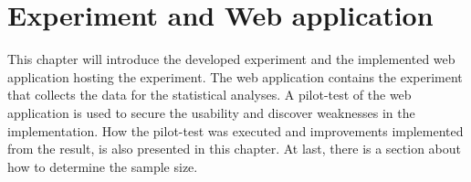\chapter{Experiment and Web application}
This chapter will introduce the developed experiment and the implemented web application hosting the experiment. The web application contains the experiment that collects the data for the statistical analyses. A pilot-test of the web application is used to secure the usability and discover weaknesses in the implementation. How the pilot-test was executed and improvements implemented from the result, is also presented in this chapter. At last, there is a section about how to determine the sample size.  


